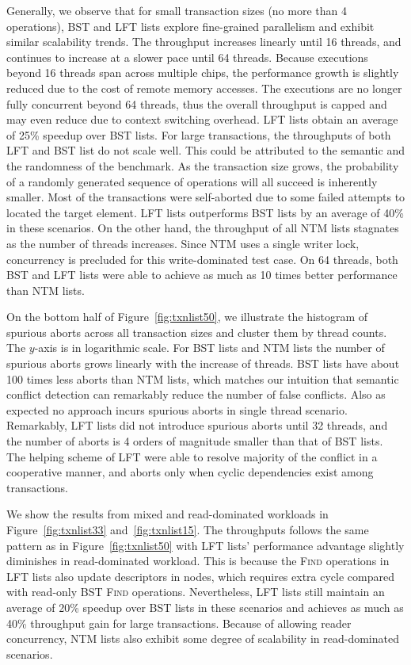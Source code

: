\documentclass[]{sig-alternate-05-2015}
\begin{document}
Generally, we observe that for small transaction sizes (no more than 4 operations), BST and LFT lists explore fine-grained parallelism and exhibit similar scalability trends.
The throughput increases linearly until 16 threads, and continues to increase at a slower pace until 64 threads.
Because executions beyond 16 threads span across multiple chips, the performance growth is slightly reduced due to the cost of remote memory accesses.
The executions are no longer fully concurrent beyond 64 threads, thus the overall throughput is capped and may even reduce due to context switching overhead.
LFT lists obtain an average of 25\% speedup over BST lists.
For large transactions, the throughputs of both LFT and BST list do not scale well.
This could be attributed to the semantic and the randomness of the benchmark.
As the transaction size grows, the probability of a randomly generated sequence of operations will all succeed is inherently smaller.
Most of the transactions were self-aborted due to some failed attempts to located the target element.
LFT lists outperforms BST lists by an average of 40\% in these scenarios.
On the other hand, the throughput of all NTM lists stagnates as the number of threads increases.
Since NTM uses a single writer lock, concurrency is precluded for this write-dominated test case.
On 64 threads, both BST and LFT lists were able to achieve as much as 10 times better performance than NTM lists.

On the bottom half of Figure~\ref{fig:txnlist50}, we illustrate the histogram of spurious aborts across all transaction sizes and cluster them by thread counts.
The $y$-axis is in logarithmic scale.
For BST lists and NTM lists the number of spurious aborts grows linearly with the increase of threads.
BST lists have about 100 times less aborts than NTM lists, which matches our intuition that semantic conflict detection can remarkably reduce the number of false conflicts.
Also as expected no approach incurs spurious aborts in single thread scenario.
Remarkably, LFT lists did not introduce spurious aborts until 32 threads, and the number of aborts is 4 orders of magnitude smaller than that of BST lists. 
The helping scheme of LFT were able to resolve majority of the conflict in a cooperative manner, and aborts only when cyclic dependencies exist among transactions.

We show the results from mixed and read-dominated workloads in Figure~\ref{fig:txnlist33} and~\ref{fig:txnlist15}. 
The throughputs follows the same pattern as in Figure~\ref{fig:txnlist50} with LFT lists' performance advantage slightly diminishes in read-dominated workload.
This is because the \textsc{Find} operations in LFT lists also update descriptors in nodes, which requires extra cycle compared with read-only BST \textsc{Find} operations.
Nevertheless, LFT lists still maintain an average of 20\% speedup over BST lists in these scenarios and achieves as much as 40\% throughput gain for large transactions.  
Because of allowing reader concurrency, NTM lists also exhibit some degree of scalability in read-dominated scenarios.
\end{document}
